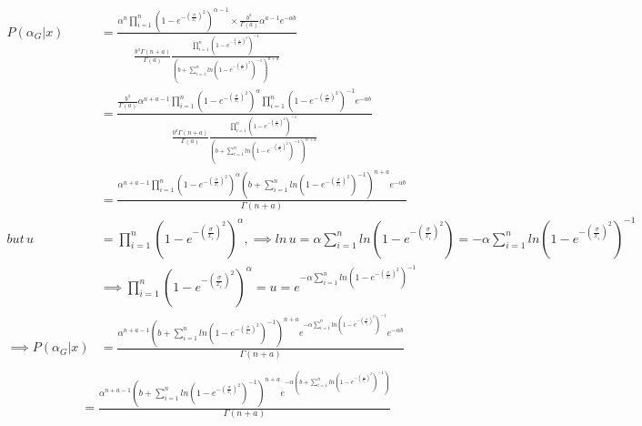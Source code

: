 \documentclass[a4paper,12pt]{report}
\begin{document}
\[\begin{split}
P(\alpha_G|x)&=\frac{\alpha^n \prod\limits_{ i=1 }^{n}\left(1-e^{-\left(\frac{\sigma}{x_i}\right)^2}\right)^{\alpha-1} \times \frac{b^a}{\Gamma(a)}\alpha^{a-1}e^{-\alpha b}}{\frac{b^a\Gamma(n+a)}{\Gamma(a)}\frac{\prod\limits_{ i=1 }^{n}\left(1-e^{-\left(\frac{\sigma}{x_i}\right)^2}\right)^{-1}}{\left(b+\sum\limits_{ i=1 }^{n}ln\left(1-e^{-\left(\frac{\sigma}{x_i}\right)^2}\right)^{-1}\right)^{n+a}}}\\
&=\frac{\frac{b^a}{\Gamma(a)}\alpha^{n+a-1}\prod\limits_{ i=1 }^{n}\left(1-e^{-\left(\frac{\sigma}{x_i}\right)^2}\right)^{\alpha}\prod\limits_{ i=1 }^{n}\left(1-e^{-\left(\frac{\sigma}{x_i}\right)^2}\right)^{-1}e^{-\alpha b}}{ \frac{b^a\Gamma(n+a)}{\Gamma(a)}\frac{\prod\limits_{ i=1 }^{n}\left(1-e^{-\left(\frac{\sigma}{x_i}\right)^2}\right)^{-1}}{\left(b+\sum\limits_{ i=1 }^{n}ln\left(1-e^{-\left(\frac{\sigma}{x_i}\right)^2}\right)^{-1}\right)^{n+a}}}\\
&=\frac{\alpha^{n+a-1}\prod\limits_{ i=1 }^{n}\left(1-e^{-\left(\frac{\sigma}{x_i}\right)^2}\right)^{\alpha}\left(b+\sum\limits_{ i=1 }^{n}ln\left(1-e^{-\left(\frac{\sigma}{x_i}\right)^2}\right)^{-1}\right)^{n+a}e^{-\alpha b}}{\Gamma(n+a)}\\
but \, u&=\prod\limits_{ i=1 }^{n}\left(1-e^{-\left(\frac{\sigma}{x_i}\right)^2}\right)^{\alpha},\implies ln\,u=\alpha\sum\limits_{ i=1 }^{n}ln\left(1-e^{-\left(\frac{\sigma}{x_i}\right)^2}\right)=-\alpha\sum\limits_{ i=1 }^{n}ln\left(1-e^{-\left(\frac{\sigma}{x_i}\right)^2}\right)^{-1}\\
&\implies \prod\limits_{ i=1 }^{n}\left(1-e^{-\left(\frac{\sigma}{x_i}\right)^2}\right)^{\alpha}=u=e^{-\alpha\sum\limits_{ i=1 }^{n}ln\left(1-e^{-\left(\frac{\sigma}{x_i}\right)^2}\right)^{-1}}\\
\implies P(\alpha_G|x)&=\frac{\alpha^{n+a-1}\left(b+\sum\limits_{ i=1 }^{n}ln\left(1-e^{-\left(\frac{\sigma}{x_i}\right)^2}\right)^{-1}\right)^{n+a}e^{-\alpha\sum\limits_{ i=1 }^{n}ln\left(1-e^{-\left(\frac{\sigma}{x_i}\right)^2}\right)^{-1}}e^{-\alpha b}}{\Gamma(n+a)}\\
\end{split}\]
\begin{equation}\label{3.25}
\begin{split}
&=\frac{\alpha^{n+a-1}\left(b+\sum\limits_{ i=1 }^{n}ln\left(1-e^{-\left(\frac{\sigma}{x_i}\right)^2}\right)^{-1}\right)^{n+a}e^{-\alpha\left(b+\sum\limits_{ i=1 }^{n}ln\left(1-e^{-\left(\frac{\sigma}{x_i}\right)^2}\right)^{-1}\right)}} {\Gamma(n+a)}
\end{split}
\end{equation}
\end{document}
